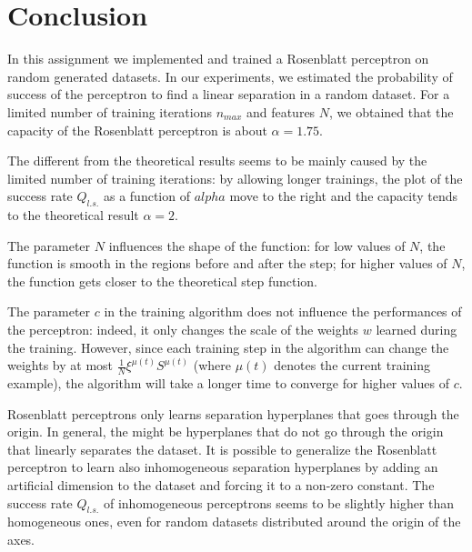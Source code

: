 \section{Conclusion}

In this assignment we implemented and trained a Rosenblatt perceptron on random generated datasets.
In our experiments, we estimated the probability of success of the perceptron to find a linear separation in a random dataset.
For a limited number of training iterations $n_{max}$ and features $N$, we obtained that the capacity of the Rosenblatt perceptron is about $\alpha = 1.75$.

The different from the theoretical results seems to be mainly caused by the limited number of training iterations:
by allowing longer trainings, the plot of the success rate $Q_{l.s.}$ as a function of $alpha$ move to the right and the capacity tends to the theoretical result $\alpha = 2$.

The parameter $N$ influences the shape of the function:
for low values of $N$, the function is smooth in the regions before and after the step;
for higher values of $N$, the function gets closer to the theoretical step function.

The parameter $c$ in the training algorithm does not influence the performances of the perceptron:
indeed, it only changes the scale of the weights $w$ learned during the training.
However, since each training step in the algorithm can change the weights by at most $\frac{1}{N}\xi^{\mu(t)} S^{\mu(t)}$ (where $\mu(t)$ denotes the current training example), the algorithm will take a longer time to converge for higher values of $c$.

Rosenblatt perceptrons only learns separation hyperplanes that goes through the origin.
In general, the might be hyperplanes that do not go through the origin that linearly separates the dataset.
It is possible to generalize the Rosenblatt perceptron to learn also inhomogeneous separation hyperplanes by adding an artificial dimension to the dataset and forcing it to a non-zero constant.
The success rate $Q_{l.s.}$ of inhomogeneous perceptrons seems to be slightly higher than homogeneous ones, even for random datasets distributed around the origin of the axes.
